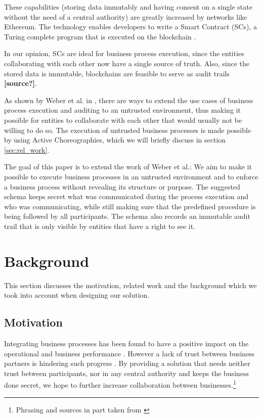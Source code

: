 \documentclass[runningheads]{llncs}
\begin{document}
These capabilities (storing data immutably and having consent on a single state without the need of a central authority) are greatly increased by networks like Ethereum. The technology enables developers to write a Smart Contract (SCs), a Turing complete program that is executed on the blockchain \cite{buterin2014next}.

In our opinion, SCs are ideal for business process execution, since the entities collaborating with each other now have a single source of truth. Also, since the stored data is immutable, blockchains are feasible to serve as audit trails \textbf{[source?]}.

As shown by Weber et al. in \cite{weber2016untrusted}, there are ways to extend the use cases of business process execution and auditing to an untrusted environment, thus making it possible for entities to collaborate with each other that would usually not be willing to do so. The execution of untrusted business processes is made possible by using Active Choreographies, which we will briefly discuss in section \ref{sec:rel_work}.

The goal of this paper is to extend the work of Weber et al.: We aim to make it possible to execute business processes in an untrusted environment and to enforce a business process without revealing its structure or purpose. The suggested schema keeps secret what was communicated during the process execution and who was communicating, while still making sure that the predefined procedure is being followed by all participants. The schema also records an immutable audit trail that is only visible by entities that have a right to see it. 


\section{Background} \label{sec:background}

This section discusses the motivation, related work and the background which we took into account when designing our solution.


\subsection{Motivation} \label{sec:motivation}


Integrating business processes has been found to have a positive impact on the operational and business performance \cite{flynn2010impact,narayanan2011antecedents}. However a lack of trust between business partners is hindering such progress \cite{panayides2009impact}. By providing a solution that needs neither trust between participants, nor in any central authority and keeps the business done secret, we hope to further increase collaboration between businesses.\footnote{Phrasing and sources in part taken from \cite{weber2016untrusted}}
\end{document}
